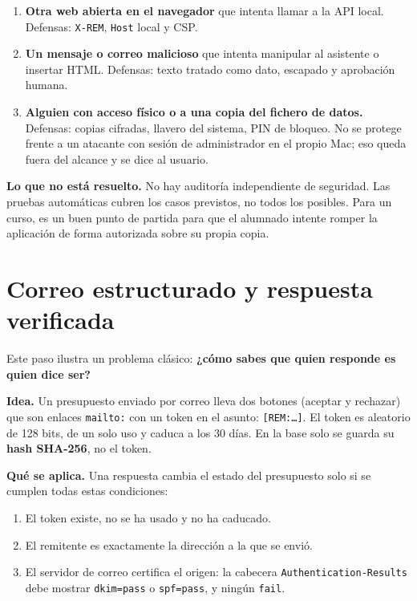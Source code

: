 \begin{enumerate}
\def\labelenumi{\arabic{enumi}.}
\tightlist
\item
  \textbf{Otra web abierta en el navegador} que intenta llamar a la API local. Defensas: \texttt{X-REM}, \texttt{Host} local y CSP.
\item
  \textbf{Un mensaje o correo malicioso} que intenta manipular al asistente o insertar HTML. Defensas: texto tratado como dato, escapado y aprobación humana.
\item
  \textbf{Alguien con acceso físico o a una copia del fichero de datos.} Defensas: copias cifradas, llavero del sistema, PIN de bloqueo. No se protege frente a un atacante con sesión de administrador en el propio Mac; eso queda fuera del alcance y se dice al usuario.
\end{enumerate}

\textbf{Lo que no está resuelto.} No hay auditoría independiente de seguridad. Las pruebas automáticas cubren los casos previstos, no todos los posibles. Para un curso, es un buen punto de partida para que el alumnado intente romper la aplicación de forma autorizada sobre su propia copia.

\chapter{Correo estructurado y respuesta verificada}\label{cap:correoverificado}\label{correo-estructurado-y-respuesta-verificada}

Este paso ilustra un problema clásico: \textbf{¿cómo sabes que quien responde es quien dice ser?}

\textbf{Idea.} Un presupuesto enviado por correo lleva dos botones (aceptar y rechazar) que son enlaces \texttt{mailto:} con un token en el asunto: \texttt{{[}REM:…{]}}. El token es aleatorio de 128 bits, de un solo uso y caduca a los 30 días. En la base solo se guarda su \textbf{hash SHA-256}, no el token.

\textbf{Qué se aplica.} Una respuesta cambia el estado del presupuesto solo si se cumplen todas estas condiciones:

\begin{enumerate}
\def\labelenumi{\arabic{enumi}.}
\tightlist
\item
  El token existe, no se ha usado y no ha caducado.
\item
  El remitente es exactamente la dirección a la que se envió.
\item
  El servidor de correo certifica el origen: la cabecera \texttt{Authentication-Results} debe mostrar \texttt{dkim=pass} o \texttt{spf=pass}, y ningún \texttt{fail}.
\end{enumerate}

